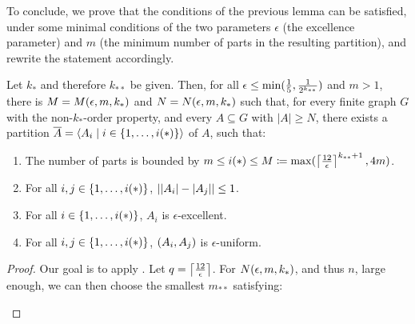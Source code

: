         To conclude, we prove that the conditions of the previous lemma can be satisfied, under some minimal conditions
        of the two parameters $\epsilon$ (the excellence parameter) and $m$ (the minimum number of parts in the resulting
        partition), and rewrite the statement accordingly.

        \begin{theorem} \label{thm:minimal_conditions_for_excellent_partitions}
            Let $k_*$ and therefore $k_{**}$ be given.
            Then, for all $\epsilon \leq \min ( \frac{1}{5}, \frac{1}{2^{k_{**}}} )$ and $m > 1$, there is $M = M( \epsilon, m, k_* )$
            and $N = N( \epsilon, m, k_* )$ such that, for every finite graph $G$ with the non-$k_{*}$-order property, and
            every $A \subseteq G$ with $|A| \geq N$, there exists a partition $\overline{A} = \left< A_i \mid i \in \{ 1, \dots, i(*) \} \right>$
            of $A$, such that:
            \begin{enumerate}
                \item \label{itm:minimal_conditions_for_excellent_partitions.0} The number of parts is bounded by
                    $m \leq i(*) \leq M \coloneqq \max ( \left\lceil \frac{12}{\epsilon} \right\rceil^{k_{**}+1}, 4m )$.
                \item \label{itm:minimal_conditions_for_excellent_partitions.1}
                    For all $i, j \in \{ 1, \dots, i(*) \}$, $| | A_i |- | A_j | | \leq 1$.
                \item \label{itm:minimal_conditions_for_excellent_partitions.2}
                    For all $i \in \{ 1, \dots, i(*) \}$, $A_i$ is $\epsilon$-excellent.
                \item \label{itm:minimal_conditions_for_excellent_partitions.3}
                    For all $i, j \in \{ 1, \dots, i(*) \}$, $( A_i, A_j )$ is $\epsilon$-uniform.  
            \end{enumerate}
            \begin{proof}
                Our goal is to apply .
                Let $q = \left\lceil \frac{12}{\epsilon} \right\rceil$.
                For $N( \epsilon, m, k_* )$, and thus $n$, large enough, we can then choose the smallest $m_{**}$ satisfying:
                \begin{enumerate}[label=(\alph*), ref=\alph*]

\end{enumerate}
\end{proof}
\end{theorem}
